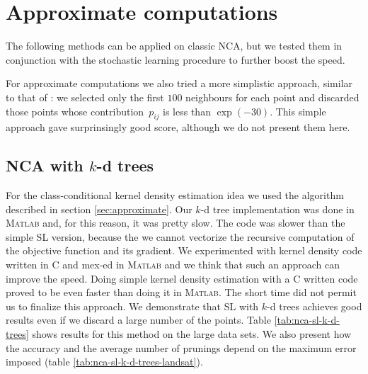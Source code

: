 \section{Approximate computations}
\label{sec:eval-nca-approx}

The following methods can be applied on classic NCA, but we tested them in conjunction with the stochastic learning procedure to further boost the speed. 

For approximate computations we also tried a more simplistic approach, similar to that of \citet{weinberger2007}: we selected only the first $100$ neighbours for each point and discarded those points whose contribution~$p_{ij}$ is less than $\exp(-30)$. This simple approach gave surprinsingly good score, although we do not present them here.

\subsection{NCA with $k$-d trees}
\label{subsec:eval-nca-k-d-trees}

For the class-conditional kernel density estimation idea we used the algorithm described in section \ref{sec:approximate}. Our $k$-d tree implementation was done in \textsc{Matlab} and, for this reason, it was pretty slow. The code was slower than the simple SL version, because the we cannot vectorize the recursive computation of the objective function and its gradient. We experimented with kernel density code written in C and mex-ed in \textsc{Matlab} and we think that such an approach can improve the speed. Doing simple kernel density estimation with a C written code proved to be even faster than doing it in \textsc{Matlab}. The short time did not permit us to finalize this approach. We demonstrate that SL with $k$-d trees achieves good results even if we discard a large number of the points. Table \ref{tab:nca-sl-k-d-trees} shows results for this method on the large data sets. We also present how the accuracy and the average number of prunings depend on the maximum error imposed (table \ref{tab:nca-sl-k-d-trees-landsat}). 

